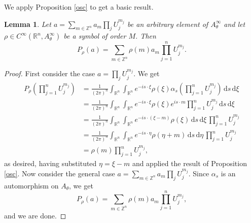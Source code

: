 \documentclass[10pt]{article}
\newtheorem{lem}[thm]{Lemma}
\theoremstyle{remark}
\theoremstyle{definition}
\begin{document}
We apply Proposition \ref{osc} to get a basic result.
\begin{lem}\label{opn}
Let $a=\sum_{m\in\mathbb Z^n}a_m\prod_jU_j^{m_j}$
be an arbitrary element of $A_{\theta}^{\infty}$ and let
$\rho\in C^{\infty}(\mathbb R^n,A_{\theta}^{\infty})$ be a symbol of order $M$.
Then $$P_{\rho}(a)=\sum_{m\in\mathbb Z^n}\rho(m)a_m\prod_{j=1}^nU_j^{m_j}.$$
\end{lem}
\begin{proof}
First consider the case $a=\prod_jU_j^{m_j}$. We get
\begin{align*}
P_{\rho}\left(\prod_{j=1}^nU_j^{m_j}\right)
&=\frac{1}{(2\pi)^n}\int_{\mathbb R^n}\!\int_{\mathbb R^n}\!
e^{-is\cdot\xi}\rho(\xi)\alpha_s\left(\prod_{j=1}^nU_j^{m_j}\right)
\,\mathrm ds\,\mathrm d\xi \\
&=\frac{1}{(2\pi)^n}\int_{\mathbb R^n}\!\int_{\mathbb R^n}\!
e^{-is\cdot\xi}\rho(\xi)e^{is\cdot m}\prod_{j=1}^nU_j^{m_j}
\,\mathrm ds\,\mathrm d\xi \\
&=\frac{1}{(2\pi)^n}\int_{\mathbb R^n}\!\int_{\mathbb R^n}\!
e^{-is\cdot(\xi-m)}\rho(\xi)\,\mathrm ds\,\mathrm d\xi\,
\prod_{j=1}^nU_j^{m_j} \\
&=\frac{1}{(2\pi)^n}\int_{\mathbb R^n}\!\int_{\mathbb R^n}\!
e^{-is\cdot\eta}\rho(\eta+m)\,\mathrm ds\,\mathrm d\eta
\,\prod_{j=1}^nU_j^{m_j} \\
&=\rho(m)\prod_{j=1}^nU_j^{m_j},
\end{align*}
as desired, having substituted $\eta=\xi-m$ and applied the result of
Proposition \ref{osc}.
Now consider the general case
$a=\sum_{m\in\mathbb Z^n}a_m\prod_jU_j^{m_j}$.
Since $\alpha_s$ is an automorphism on $A_{\theta}$, we get
$$P_{\rho}(a)=\sum_{m\in\mathbb Z^n}\rho(m)a_m\prod_{j=1}^nU_j^{m_j},$$
and we are done.
\end{proof}
\end{document}
